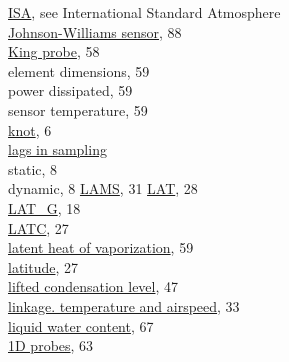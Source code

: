 \documentclass[
]{book}
\begin{document}
\href{./3-the-state-of-the-aircraft.html\#palt}{ISA}, see International Standard Atmosphere\\
\href{./10-obsolete-variables.html\#jwlwc}{Johnson-Williams sensor}, 88\\
\href{./5-cloud-physics-variables\#plwcc}{King probe}, 58\\
\hspace*{0.333em}\hspace*{0.333em}element dimensions, 59\\
\hspace*{0.333em}\hspace*{0.333em}power dissipated, 59\\
\hspace*{0.333em}\hspace*{0.333em}sensor temperature, 59\\
\href{./2-general-information-about-data-files.html\#units-and-abbreviations}{knot}, 6\\
\href{./2-general-information-about-data-files\#synchronization-of-measurements}{lags in sampling}\\
\hspace*{0.333em}\hspace*{0.333em}static, 8\\
\hspace*{0.333em}\hspace*{0.333em}dynamic, 8
\href{./4-the-state-of-the-atmosphere\#psx}{LAMS}, 31
\href{./3-the-state-of-the-aircraft.html\#latitude}{LAT}, 28\\
\href{./3-the-state-of-the-aircraft.html\#gglat}{LAT\_G}, 18\\
\href{./3-the-state-of-the-aircraft.html\#latc-lonc}{LATC}, 27\\
\href{./3-the-state-of-the-aircraft.html\#thetae}{latent heat of vaporization}, 59\\
\href{./3-the-state-of-the-aircraft.html\#latitude}{latitude}, 27\\
\href{./3-the-state-of-the-aircraft.html\#thetae}{lifted condensation level}, 47\\
\href{./4-the-state-of-the-atmosphere.html\#atx}{linkage. temperature and airspeed}, 33\\
\href{./5-cloud-physics-variables.html\#plwcc}{liquid water content}, 67\\
\hspace*{0.333em}\hspace*{0.333em}\href{./5-cloud-physics-variables.html\#PSD-LWC}{1D probes}, 63\\
\end{document}
